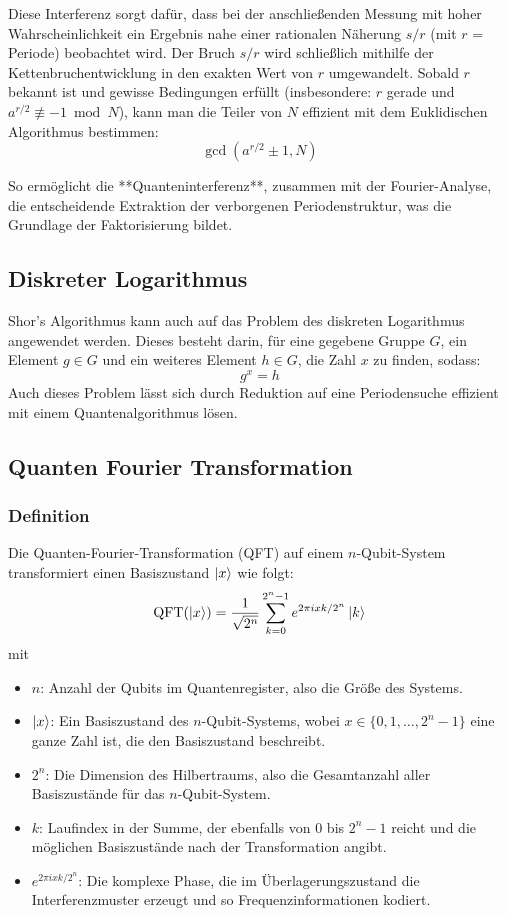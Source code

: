 \noindent Diese Interferenz sorgt dafür, dass bei der anschließenden Messung mit hoher Wahrscheinlichkeit ein Ergebnis nahe einer rationalen Näherung \( s/r \) (mit \( r \) = Periode) beobachtet wird. Der Bruch \( s/r \) wird schließlich mithilfe der Kettenbruchentwicklung in den exakten Wert von \( r \) umgewandelt. Sobald \( r \) bekannt ist und gewisse Bedingungen erfüllt (insbesondere: \( r \) gerade und \( a^{r/2} \not\equiv -1 \bmod N \)), kann man die Teiler von \( N \) effizient mit dem Euklidischen Algorithmus bestimmen:\\
\[
\gcd(a^{r/2} \pm 1, N)
\]

\noindent So ermöglicht die **Quanteninterferenz**, zusammen mit der Fourier-Analyse, die entscheidende Extraktion der verborgenen Periodenstruktur, was die Grundlage der Faktorisierung bildet.


\subsection{Diskreter Logarithmus}
Shor’s Algorithmus kann auch auf das Problem des diskreten Logarithmus angewendet werden. Dieses besteht darin, für eine gegebene Gruppe \( G \), ein Element \( g \in G \) und ein weiteres Element \( h \in G \), die Zahl \( x \) zu finden, sodass:
\[
g^x = h
\]
Auch dieses Problem lässt sich durch Reduktion auf eine Periodensuche effizient mit einem Quantenalgorithmus lösen.

\subsection{Quanten Fourier Transformation}

\subsubsection*{Definition}
Die Quanten-Fourier-Transformation (QFT) auf einem \( n \)-Qubit-System transformiert einen Basiszustand \( \ket{x} \) wie folgt:
\[
\text{QFT}(\ket{x}) = \frac{1}{\sqrt{2^n}} \sum_{k=0}^{2^n-1} e^{2\pi i xk / 2^n} \ket{k}
\]
mit
\begin{itemize}
    \item \( n \): Anzahl der Qubits im Quantenregister, also die Größe des Systems.
    \item \( \ket{x} \): Ein Basiszustand des \( n \)-Qubit-Systems, wobei \( x \in \{0, 1, \ldots, 2^n - 1\} \) eine ganze Zahl ist, die den Basiszustand beschreibt.
    \item \( 2^n \): Die Dimension des Hilbertraums, also die Gesamtanzahl aller Basiszustände für das \( n \)-Qubit-System.
    \item \( k \): Laufindex in der Summe, der ebenfalls von 0 bis \( 2^n - 1 \) reicht und die möglichen Basiszustände nach der Transformation angibt.
    \item \( e^{2 \pi i x k / 2^n} \): Die komplexe Phase, die im Überlagerungszustand die Interferenzmuster erzeugt und so Frequenzinformationen kodiert.
\end{itemize}

